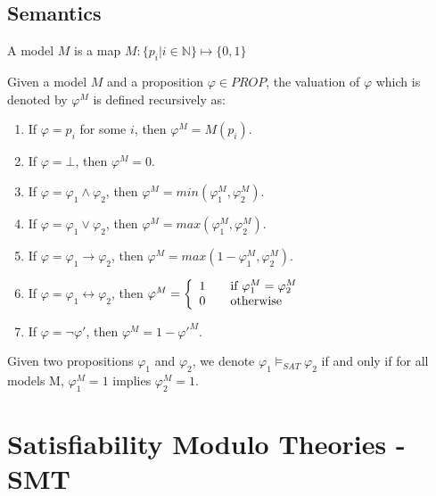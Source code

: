 \subsection{Semantics}
\begin{definition}
A model $M$ is a map $M : \{p_i | i \in \mathbb{N}\} \mapsto \{0, 1\}$
\end{definition}
\begin{definition} \label{def:pro-val}
Given a model $M$ and a proposition $\varphi \in PROP$, the valuation of $\varphi$ which is denoted by $\varphi^M$ is defined recursively as:
\begin{enumerate}
\item If $\varphi = p_i$ for some $i$, then $\varphi^M = M(p_i)$.
\item If $\varphi = \bot$, then $\varphi^M = 0$.
\item If $\varphi = \varphi_1 \wedge \varphi_2$, then $\varphi^M = min(\varphi_1^M,
 \varphi_2^M)$.
\item If $\varphi = \varphi_1 \vee \varphi_2$, then $\varphi^M = max(\varphi_1^M, \varphi_2^M)$.
\item If $\varphi = \varphi_1 \rightarrow \varphi_2$, then $\varphi^M = max(1 - \varphi_1^M, \varphi_2^M)$. 
\item If $\varphi = \varphi_1 \leftrightarrow \varphi_2$, then $\varphi^M = \left\{ 
  \begin{array}{c l}
    1 & \quad \text{if } \varphi_1^M = \varphi_2^M\\
    0 & \quad \text{otherwise }\\
  \end{array} \right.$
\item If $\varphi = \neg \varphi'$, then $\varphi^M = 1 - \varphi'^M$.
\end{enumerate}
\end{definition}


Given two propositions $\varphi_1$ and $\varphi_2$, we denote $\varphi_1 \models_{SAT} \varphi_2$ if and only if for all models M, $\varphi_1^M = 1$ implies $\varphi_2^M = 1$.
\section{Satisfiability Modulo Theories - SMT}
